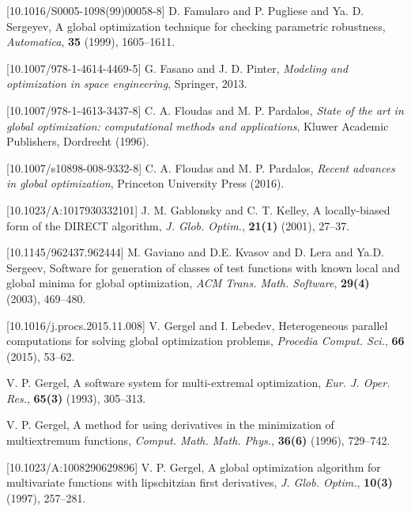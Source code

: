 \documentclass{aims}
\theoremstyle{definition}
\begin{document}
\begin{thebibliography}{10}
[10.1016/S0005-1098(99)00058-8]
\newblock D. Famularo and P. Pugliese and Ya. D. Sergeyev,
\newblock A global optimization technique for checking parametric robustness,
\newblock \emph{Automatica}, \textbf{35} (1999), 1605--1611.

[10.1007/978-1-4614-4469-5]
\newblock G. Fasano and J. D. Pinter,
\newblock \emph{Modeling and optimization in space engineering},
\newblock Springer, 2013.

[10.1007/978-1-4613-3437-8]
\newblock C. A. Floudas and M. P. Pardalos,
\newblock \emph{State of the art in global optimization: computational methods and applications},
\newblock Kluwer Academic Publishers, Dordrecht (1996).

[10.1007/s10898-008-9332-8]
\newblock C. A. Floudas and M. P. Pardalos,
\newblock \emph{Recent advances in global optimization},
\newblock Princeton University Press (2016).

[10.1023/A:1017930332101]
\newblock J. M. Gablonsky and C. T. Kelley,
\newblock A locally-biased form of the DIRECT algorithm,
\newblock \emph{J. Glob. Optim.}, \textbf{21(1)} (2001), 27--37.

[10.1145/962437.962444]
\newblock M. Gaviano and D.E. Kvasov and D. Lera and Ya.D. Sergeev,
\newblock Software for generation of classes of test functions with known local and global minima for global optimization,
\newblock \emph{ACM Trans. Math. Software}, \textbf{29(4)} (2003), 469--480.

[10.1016/j.procs.2015.11.008]
\newblock V. Gergel and I. Lebedev,
\newblock Heterogeneous parallel computations for solving global optimization problems,
\newblock \emph{Procedia Comput. Sci.}, \textbf{66} (2015), 53--62.

\newblock V. P. Gergel,
\newblock A software system for multi-extremal optimization,
\newblock \emph{Eur. J. Oper. Res.}, \textbf{65(3)} (1993), 305--313.

\newblock V. P. Gergel,
\newblock A method for using derivatives in the minimization of multiextremum functions,
\newblock \emph{Comput. Math. Math. Phys.}, \textbf{36(6)} (1996), 729--742.

[10.1023/A:1008290629896]
\newblock V. P. Gergel,
\newblock A global optimization algorithm for multivariate functions with lipschitzian first derivatives,
\newblock \emph{J. Glob. Optim.}, \textbf{10(3)} (1997), 257--281.


\end{thebibliography}
\end{document}
